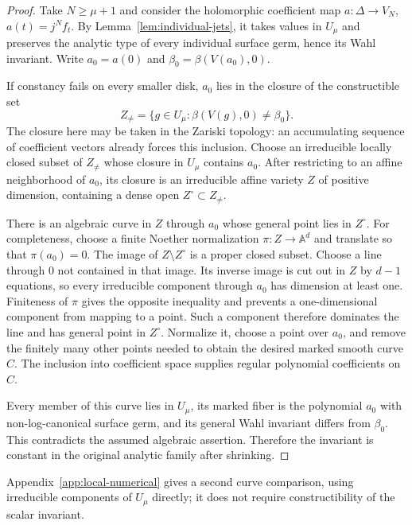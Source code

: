\begin{proof}
Take $N\geq\mu+1$ and consider the holomorphic coefficient map
$a:\Delta\to V_N$, $a(t)=j^Nf_t$.  By
Lemma~\ref{lem:individual-jets}, it takes values in $U_\mu$ and
preserves the analytic type of every individual surface germ, hence
its Wahl invariant.  Write $a_0=a(0)$ and $\beta_0=\beta(V(a_0),0)$.

If constancy fails on every smaller disk, $a_0$ lies in the closure
of the constructible set
\[
 Z_{\ne}=\{g\in U_\mu:\beta(V(g),0)\ne\beta_0\}.
\]
The closure here may be taken in the Zariski topology: an accumulating
sequence of coefficient vectors already forces this inclusion.
Choose an irreducible locally closed subset of $Z_{\ne}$ whose closure
in $U_\mu$ contains $a_0$.  After restricting to an affine neighborhood
of $a_0$, its closure is an irreducible affine variety $Z$ of positive
dimension, containing a dense open $Z^\circ\subset Z_{\ne}$.

There is an algebraic curve in $Z$ through $a_0$ whose general point
lies in $Z^\circ$.  For completeness, choose a finite Noether
normalization $\pi:Z\to\mathbb A^d$ and translate so that
$\pi(a_0)=0$.  The image of $Z\setminus Z^\circ$ is a proper closed
subset.  Choose a line through $0$ not contained in that image.
Its inverse image is cut out in $Z$ by $d-1$ equations, so every
irreducible component through $a_0$ has dimension at least one.
Finiteness of $\pi$ gives the opposite inequality and prevents a
one-dimensional component from mapping to a point.  Such a component
therefore dominates the line and has general point in $Z^\circ$.
Normalize it, choose a point over $a_0$, and remove the finitely many
other points needed to obtain the desired marked smooth curve $C$.
The inclusion into coefficient space supplies regular polynomial
coefficients on $C$.

Every member of this curve lies in $U_\mu$, its marked fiber is the
polynomial $a_0$ with non-log-canonical surface germ, and its general
Wahl invariant differs from $\beta_0$.  This contradicts the assumed
algebraic assertion.  Therefore the invariant is constant in the
original analytic family after shrinking.
\end{proof}

Appendix~\ref{app:local-numerical} gives a second curve comparison,
using irreducible components of $U_\mu$ directly; it does not require
constructibility of the scalar invariant.
